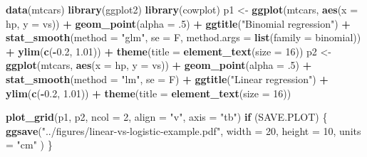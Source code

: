 \documentclass[
]{article}
\newenvironment{Shaded}{\begin{snugshade}}{\end{snugshade}}
\newcommand{\AttributeTok}[1]{\textcolor[rgb]{0.13,0.29,0.53}{#1}}
\newcommand{\ControlFlowTok}[1]{\textcolor[rgb]{0.13,0.29,0.53}{\textbf{#1}}}
\newcommand{\DecValTok}[1]{\textcolor[rgb]{0.00,0.00,0.81}{#1}}
\newcommand{\FloatTok}[1]{\textcolor[rgb]{0.00,0.00,0.81}{#1}}
\newcommand{\FunctionTok}[1]{\textcolor[rgb]{0.13,0.29,0.53}{\textbf{#1}}}
\newcommand{\NormalTok}[1]{#1}
\newcommand{\OtherTok}[1]{\textcolor[rgb]{0.56,0.35,0.01}{#1}}
\newcommand{\SpecialCharTok}[1]{\textcolor[rgb]{0.81,0.36,0.00}{\textbf{#1}}}
\newcommand{\StringTok}[1]{\textcolor[rgb]{0.31,0.60,0.02}{#1}}
\begin{document}
\begin{Shaded}
\begin{Highlighting}[]
\FunctionTok{data}\NormalTok{(mtcars)}
\FunctionTok{library}\NormalTok{(ggplot2)}
\FunctionTok{library}\NormalTok{(cowplot)}
\NormalTok{p1 }\OtherTok{\textless{}{-}} \FunctionTok{ggplot}\NormalTok{(mtcars, }\FunctionTok{aes}\NormalTok{(}\AttributeTok{x =}\NormalTok{ hp, }\AttributeTok{y =}\NormalTok{ vs)) }\SpecialCharTok{+}
  \FunctionTok{geom\_point}\NormalTok{(}\AttributeTok{alpha =}\NormalTok{ .}\DecValTok{5}\NormalTok{) }\SpecialCharTok{+}
  \FunctionTok{ggtitle}\NormalTok{(}\StringTok{"Binomial regression"}\NormalTok{) }\SpecialCharTok{+}
  \FunctionTok{stat\_smooth}\NormalTok{(}\AttributeTok{method =} \StringTok{"glm"}\NormalTok{, }\AttributeTok{se =}\NormalTok{ F,}
              \AttributeTok{method.args =} \FunctionTok{list}\NormalTok{(}\AttributeTok{family =}\NormalTok{ binomial)) }\SpecialCharTok{+}
  \FunctionTok{ylim}\NormalTok{(}\FunctionTok{c}\NormalTok{(}\SpecialCharTok{{-}}\FloatTok{0.2}\NormalTok{, }\FloatTok{1.01}\NormalTok{)) }\SpecialCharTok{+}
  \FunctionTok{theme}\NormalTok{(}\AttributeTok{title =} \FunctionTok{element\_text}\NormalTok{(}\AttributeTok{size =} \DecValTok{16}\NormalTok{))}
\NormalTok{p2 }\OtherTok{\textless{}{-}} \FunctionTok{ggplot}\NormalTok{(mtcars, }\FunctionTok{aes}\NormalTok{(}\AttributeTok{x =}\NormalTok{ hp, }\AttributeTok{y =}\NormalTok{ vs)) }\SpecialCharTok{+}
  \FunctionTok{geom\_point}\NormalTok{(}\AttributeTok{alpha =}\NormalTok{ .}\DecValTok{5}\NormalTok{) }\SpecialCharTok{+}
  \FunctionTok{stat\_smooth}\NormalTok{(}\AttributeTok{method =} \StringTok{"lm"}\NormalTok{, }\AttributeTok{se =}\NormalTok{ F) }\SpecialCharTok{+}
  \FunctionTok{ggtitle}\NormalTok{(}\StringTok{"Linear regression"}\NormalTok{) }\SpecialCharTok{+}
  \FunctionTok{ylim}\NormalTok{(}\FunctionTok{c}\NormalTok{(}\SpecialCharTok{{-}}\FloatTok{0.2}\NormalTok{, }\FloatTok{1.01}\NormalTok{)) }\SpecialCharTok{+}
  \FunctionTok{theme}\NormalTok{(}\AttributeTok{title =} \FunctionTok{element\_text}\NormalTok{(}\AttributeTok{size =} \DecValTok{16}\NormalTok{))}

\FunctionTok{plot\_grid}\NormalTok{(p1, p2, }\AttributeTok{ncol =} \DecValTok{2}\NormalTok{, }\AttributeTok{align =} \StringTok{"v"}\NormalTok{, }\AttributeTok{axis =} \StringTok{"tb"}\NormalTok{)}
\ControlFlowTok{if}\NormalTok{ (SAVE.PLOT) \{}
  \FunctionTok{ggsave}\NormalTok{(}\StringTok{"../figures/linear{-}vs{-}logistic{-}example.pdf"}\NormalTok{,}
    \AttributeTok{width =} \DecValTok{20}\NormalTok{, }\AttributeTok{height =} \DecValTok{10}\NormalTok{, }\AttributeTok{units =} \StringTok{"cm"}
\NormalTok{  )}
\NormalTok{\}}
\end{Highlighting}
\end{Shaded}
\end{document}
